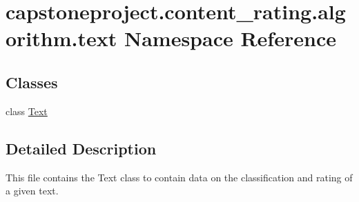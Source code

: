 \hypertarget{namespacecapstoneproject_1_1content__rating_1_1algorithm_1_1text}{}\section{capstoneproject.\+content\+\_\+rating.\+algorithm.\+text Namespace Reference}
\label{namespacecapstoneproject_1_1content__rating_1_1algorithm_1_1text}
\subsection*{Classes}
\begin{DoxyCompactItemize}
\item 
class \mbox{\hyperlink{classcapstoneproject_1_1content__rating_1_1algorithm_1_1text_1_1_text}{Text}}
\end{DoxyCompactItemize}


\subsection{Detailed Description}
\begin{DoxyVerb}This file contains the Text class to contain data on the classification
and rating of a given text.
\end{DoxyVerb}
 